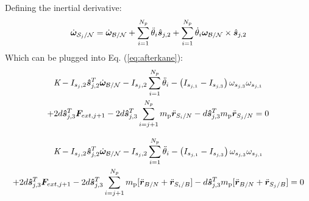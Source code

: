 Defining the inertial derivative:
\begin{equation}
	\dot{\bm \omega}_{\mathcal{S}_{j}/\mathcal{N}} = \dot{\bm \omega}_{\cal{B/N}} + \sum^{N_p}_{i=1}\ddot{\theta}_{i} \hat{\bm s}_{j,2} + \sum^{N_p}_{i=1}\dot{\theta}_{i} \bm \omega_{\cal{B/N}} \times \hat{\bm s}_{j,2}
\end{equation}
Which can be plugged into Eq. (\ref{eq:afterkane}):
\begin{multline}
	\textit{K} - I_{s_j,2} \bm{\hat{s}}_{j,2}^T \dot{\bm\omega}_{\cal B/N} - I_{s_j,2} \sum^{N_p}_{i=1}\ddot{\theta}_i - \left( I_{s_{j,1}} - I_{s_{j,3}}\right) \omega_{s_{j,3}} \omega_{s_{j,1}}\\
	+ 2d\bm{\hat{s}}^{T}_{j,3}\bm F_{ext,j+1} - 2d\bm{\hat{s}}^{T}_{j,3}\sum^{N_p}_{i=j+1}m_{\text{p}} \ddot{\bm r}_{S_{i}/N} - d\bm{\hat{s}}^{T}_{j,3} m_{\text{p}} \ddot{\bm r}_{S_{j}/N} = 0 %
\end{multline}

\begin{multline}
	\textit{K} - I_{s_j,2} \bm{\hat{s}}_{j,2}^T \dot{\bm\omega}_{\cal B/N} - I_{s_j,2} \sum^{N_p}_{i=1}\ddot{\theta}_i - \left( I_{s_{j,1}} - I_{s_{j,3}}\right) \omega_{s_{j,3}} \omega_{s_{j,1}}\\
	+ 2d\bm{\hat{s}}^{T}_{j,3}\bm F_{ext,j+1} - 2d\bm{\hat{s}}^{T}_{j,3}\sum^{N_p}_{i=j+1}m_{\text{p}} [\ddot{\bm r}_{B/N} + \ddot{\bm r}_{S_{i}/B}] - d\bm{\hat{s}}^{T}_{j,3} m_{\text{p}} [\ddot{\bm r}_{B/N} + \ddot{\bm r}_{S_{j}/B}] = 0 %
\end{multline}

